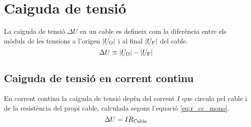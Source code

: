%
%
%
%
%


\section{Caiguda de tensi\'{o}}

La caiguda de tensi\'{o} $\Delta U$ en un cable es defineix com la difer\`{e}ncia entre els m\`{o}duls de les tensions a l'origen $|{\cmplx{U}\ped{O}}|$ i al final $|\cmplx{U}\ped{F}|$ del cable.
\begin{equation}
   \Delta U \equiv |\cmplx{U}\ped{O}| - |\cmplx{U}\ped{F}|
\end{equation}

\subsection{Caiguda de tensi\'{o} en corrent continu}

En corrent continu la caiguda de tensi\'{o} dep\`{e}n del corrent $I$ que circula pel cable i de la  resist\`{e}ncia del propi cable, calculada segons l'equaci\'{o} \eqref{eq:r_cc_mono}.
\begin{equation}
   \Delta U = I R_\mathrm{Cable}
\end{equation}

